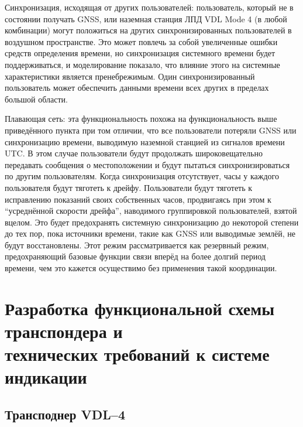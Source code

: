 \documentclass[a4paper,12pt]{report} %
\begin{document}
Синхронизация, исходящая от других пользователей: пользователь, который не в
состоянии получать GNSS, или наземная станция ЛПД VDL Mode 4 (в любой
комбинации) могут положиться на других синхронизированных пользователей в
воздушном пространстве. Это может повлечь за собой увеличенные ошибки средств
определения времени, но синхронизация системного времени будет поддерживаться, и
моделирование показало, что влияние этого на системные характеристики является
пренебрежимым. Один синхронизированный пользователь может обеспечить данными
времени всех других в пределах большой области.

Плавающая сеть: эта функциональность похожа на функциональность выше
приведённого пункта при том отличии, что все пользователи потеряли GNSS или
синхронизацию времени, выводимую наземной станцией из сигналов времени UTC. В
этом случае пользователи будут продолжать широковещательно передавать сообщения
о местоположении и будут пытаться синхронизироваться по другим пользователям.
Когда синхронизация отсутствует, часы у каждого пользователя будут тяготеть к
дрейфу. Пользователи будут тяготеть к исправлению показаний своих собственных
часов, продвигаясь при этом к ``усреднённой скорости дрейфа'', наводимого
группировкой пользователей, взятой вцелом. Это будет предохранять системную
синхронизацию до некоторой степени до тех пор, пока источники времени, такие как
GNSS или выводимые землёй, не будут восстановлены. Этот режим рассматривается
как резервный режим, предохраняющий базовые функции связи вперёд на более долгий
период времени, чем это кажется осуществимо без применения такой координации.

\newpage

\chapter{Разработка функциональной схемы транспондера и \\
технических требований к системе индикации} %

\section{Трансподнер VDL--4}
\end{document}
